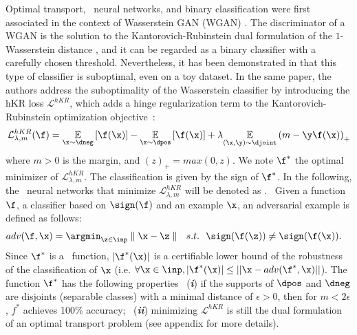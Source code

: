 Optimal transport, \onlyonelip~neural networks, and binary classification were first associated in the context of Wasserstein GAN (WGAN) \cite{Arjovsky2017}. The discriminator of a WGAN is the solution to the Kantorovich-Rubinstein dual formulation of the $1$-Wasserstein distance \cite{villani2008}, and it can be regarded as a binary classifier with a carefully chosen threshold.
Nevertheless, it has been demonstrated in \cite{serrurier2021achieving} that this type of classifier is suboptimal, even on a toy dataset. In the same paper, the authors address the suboptimality of the Wasserstein classifier by introducing the hKR loss $\mathcal{L}^{hKR}$, which adds a hinge regularization term to the Kantorovich-Rubinstein optimization objective~:
\begin{equation} \label{eq:reg_OT} 
\mathcal{L}^{hKR}_{\lambda,m}(\f) =  \underset{\x \sim \dneg}{\mathbb{E}} \left[\f(\x)\right]-\underset{\x \sim \dpos}{\mathbb{E}}\left[\f(\x)\right]  +\lambda\underset{(\x, \y) \sim \djoint}{\mathbb{E}} \left(m-\y \f(\x)\right)_+ 
\end{equation}
where $m>0$ is the margin, and  $(z)_+ = max(0,z)$. We note $\f^*$ 
the optimal minimizer of $\mathcal{L}^{hKR}_{\lambda,m}$. The classification is given by the sign of $\f^*$. In the following, the \onlyonelip~neural networks that minimize $\mathcal{L}^{hKR}_{\lambda,m}$ will be denoted as \otnn.
~Given a function $\f$, a classifier based on $\sign(\f)$ and an example $\x$, an adversarial example is defined as follows:
\begin{align}
    &adv(\f, \x) = \argmin_{\z \in \inp} \parallel \x -\z \parallel 
    ~~ s.t. ~~ \sign(\f(\z)) \neq \sign(\f(\x)) .
    \label{def:adversary}
\end{align}
Since $\f^*$ is a \onlyonelip~function, $|\f^*(\x)|$ is a certifiable lower bound of the robustness of the classification of $\x$ 
(i.e. $\forall \x \in \inp, |\f^*(\x)|\leq ||\x - adv(\f^*,\x) || $). The function $\f^*$ has the following properties \cite{serrurier2021achieving}
~(\textbf{\textit{i}}) if the supports of $\dpos$ and $\dneg$ are disjoints (separable classes) with a minimal distance of $\epsilon>0$, then for $m<2\epsilon$, $f^*$ 
achieves 100\% accuracy; %
~(\textbf{\textit{ii}}) minimizing $\mathcal{L}^{hKR}$ is still the dual formulation of an optimal transport problem (see appendix for more details).

